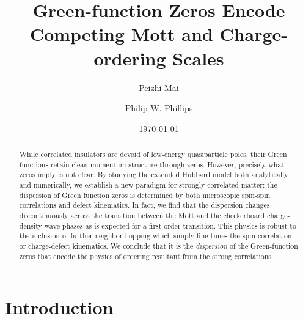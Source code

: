 \documentclass[aps,prl,reprint,superscriptaddress,nofootinbib,longbibliography]{revtex4-1}
\begin{document}
\title{Green-function Zeros Encode Competing Mott and Charge-ordering Scales}

\author{Peizhi Mai}
\author{Philip W. Phillips}
\date{\today}

\begin{abstract}
While correlated insulators are devoid of low-energy quasiparticle poles,  their Green functions retain clean momentum structure through zeros.  However, precisely what zeros imply is not clear.  By studying the extended Hubbard model both analytically and numerically, we establish a new paradigm for strongly correlated matter:  the dispersion of Green function zeros is determined by both microscopic spin-spin correlations and defect kinematics.  In fact, we find that the dispersion changes discontinuously across the transition between the  Mott and the checkerboard charge-density wave phases as is expected for a first-order transition. 
This physics is robust to the inclusion of further neighbor hopping which simply fine tunes the spin-correlation or charge-defect kinematics.  We conclude that it is the {\it dispersion} of the Green-function zeros that encode the physics of ordering resultant from the strong correlations. 
\end{abstract}

\maketitle

\section{Introduction}
\end{document}
